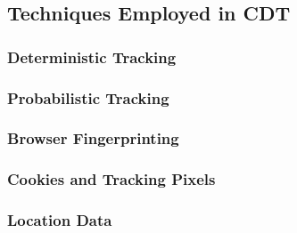 \subsection{Techniques Employed in CDT}
\subsubsection{Deterministic Tracking}
\subsubsection{Probabilistic Tracking}
\subsubsection{Browser Fingerprinting}
\subsubsection{Cookies and Tracking Pixels}
\subsubsection{Location Data}